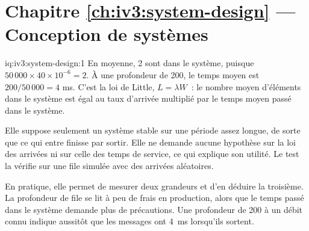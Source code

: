 \section*{Chapitre \ref{ch:iv3:system-design} --- Conception de systèmes}

\begin{solution}{iq:iv3:system-design:1}
En moyenne, 2 sont dans le système, puisque $50\,000 \times 40 \times 10^{-6} = 2$. À une profondeur de 200, le temps moyen est $200 / 50\,000 = 4$ ms. C'est la loi de Little, $L = \lambda W$~: le nombre moyen d'éléments dans le système est égal au taux d'arrivée multiplié par le temps moyen passé dans le système.

Elle suppose seulement un système stable sur une période assez longue, de sorte que ce qui entre finisse par sortir. Elle ne demande aucune hypothèse sur la loi des arrivées ni sur celle des temps de service, ce qui explique son utilité. Le test la vérifie sur une file simulée avec des arrivées aléatoires.

En pratique, elle permet de mesurer deux grandeurs et d'en déduire la troisième. La profondeur de file se lit à peu de frais en production, alors que le temps passé dans le système demande plus de précautions. Une profondeur de 200 à un débit connu indique aussitôt que les messages ont 4~ms lorsqu'ils sortent.

\end{solution}

